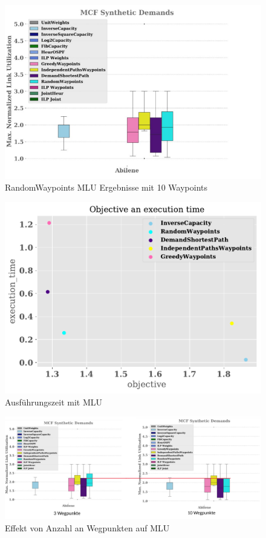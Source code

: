 \documentclass[sigconf,noacm,review]{acmart}
\begin{document}
\begin{figure}
  \centering
  \includegraphics[width=\linewidth]{assets/mluwaypoints.png}
  \caption{RandomWaypoints MLU Ergebnisse mit 10 Waypoints}
  \label{fig:random-mlu-10w-abilene}
\end{figure}

\begin{figure}
  \centering
  \caption{Ausführungszeit mit MLU}
  \label{fig:all-mlu-time-plot}
  \includegraphics[width=\linewidth]{assets/execution_time.pdf}
\end{figure}

\begin{figure}
  \centering
  \includegraphics[width=\linewidth]{assets/3vs10randomWP.png}
  \caption{Effekt von Anzahl an Wegpunkten auf MLU}
  \label{fig:random-n-points-efect}
\end{figure}
\end{document}
